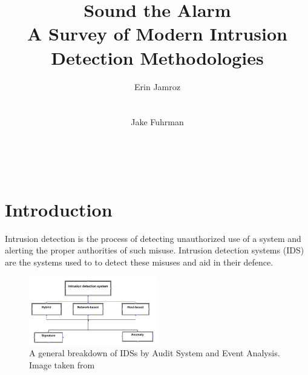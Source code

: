 \documentclass{acm_proc_article-sp}
\begin{document}
\title{Sound the Alarm\\A Survey of Modern Intrusion Detection Methodologies}

\author{
\alignauthor
Erin Jamroz
       \\
       \\
       \\
\alignauthor
Jake Fuhrman
       \\
       \\
       \\
       \\       
}

\maketitle

\begin{abstract}

\end{abstract}

\section{Introduction}
	Intrusion detection is the process of detecting unauthorized use of a system and alerting the proper authorities of such misuse. Intrusion detection systems (IDS) are the systems used to to detect these misuses and aid in their defence. 
	\begin{figure}[h!]
		\centering
		\includegraphics[width=0.5\textwidth]{idsBreakdown.png}
		\caption{A general breakdown of IDSs by Audit System and Event Analysis. Image taken from \cite{Alenezi2012}}
		\label{breakdown}
	\end{figure}
\end{document}
